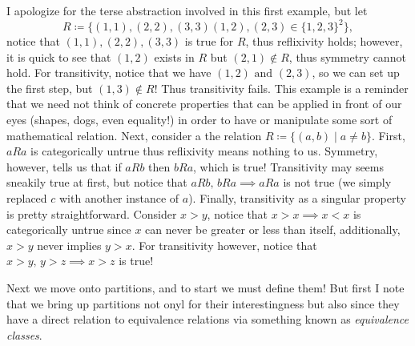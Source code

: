 \documentclass{report}
\begin{document}
\sol I apologize for the terse abstraction involved in this first example, but let \[ R\coloneqq \{(1,1),(2,2),(3,3)(1,2),(2,3)\in \{1,2,3\}^2  \}   ,\] notice that \( (1,1),(2,2),(3,3) \) is true for \( R \), thus reflixivity holds; however, it is quick to see that \( (1,2) \) exists in \( R \) but \( (2,1)\not\in R \), thus symmetry cannot hold. For transitivity, notice that we have \( (1,2) \text{ and }  (2,3)\), so we can set up the first step, but \( (1,3)\not\in  R \)! Thus transitivity fails. This example is a reminder that we need not think of concrete properties that can be applied in front of our eyes (shapes, dogs, even equality!) in order to have or manipulate some sort of mathematical relation. Next, consider a the relation \( R\coloneqq \{(a,b)\mid a \neq  b\}   \). First, \( aRa \) is categorically untrue thus reflixivity means nothing to us. Symmetry, however, tells us that if \( aRb \) then \( bRa \), which is true! Transitivity may seems sneakily true at first, but notice that \( aRb, \, bRa \implies aRa \) is not true (we simply replaced \( c \) with another instance of \( a \)). Finally, transitivity as a singular property is pretty straightforward. Consider \( x>y \), notice that \( x>x \implies x<x \) is categorically untrue since \( x \) can never be greater or less than itself, additionally, \( x>y \) never implies \( y>x \). For transitivity however, notice that \(x>y, \, y>z \implies x>z \) is true!


Next we move onto partitions, and to start we must define them! But first I note that we bring up partitions not onyl for their interestingness but also since they have a direct relation to equivalence relations via something known as \textit{equivalence classes}. 
\end{document}
